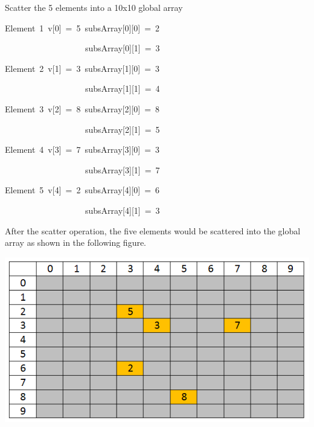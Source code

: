 Scatter the 5 elements into a 10x10 global array
\begin{lyxcode}
Element~1~v{[}0{]}~=~5~subsArray{[}0{]}{[}0{]}~=~2~

~~~~~~~~~~~~~~~~~~~subsArray{[}0{]}{[}1{]}~=~3~

Element~2~v{[}1{]}~=~3~subsArray{[}1{]}{[}0{]}~=~3~

~~~~~~~~~~~~~~~~~~~subsArray{[}1{]}{[}1{]}~=~4~

Element~3~v{[}2{]}~=~8~subsArray{[}2{]}{[}0{]}~=~8~

~~~~~~~~~~~~~~~~~~~subsArray{[}2{]}{[}1{]}~=~5~

Element~4~v{[}3{]}~=~7~subsArray{[}3{]}{[}0{]}~=~3~

~~~~~~~~~~~~~~~~~~~subsArray{[}3{]}{[}1{]}~=~7~

Element~5~v{[}4{]}~=~2~subsArray{[}4{]}{[}0{]}~=~6~

~~~~~~~~~~~~~~~~~~~subsArray{[}4{]}{[}1{]}~=~3
\end{lyxcode}
After the scatter operation, the five elements would be scattered
into the global array as shown in the following figure. 

\includegraphics[scale=0.6]{scatter-GA}

